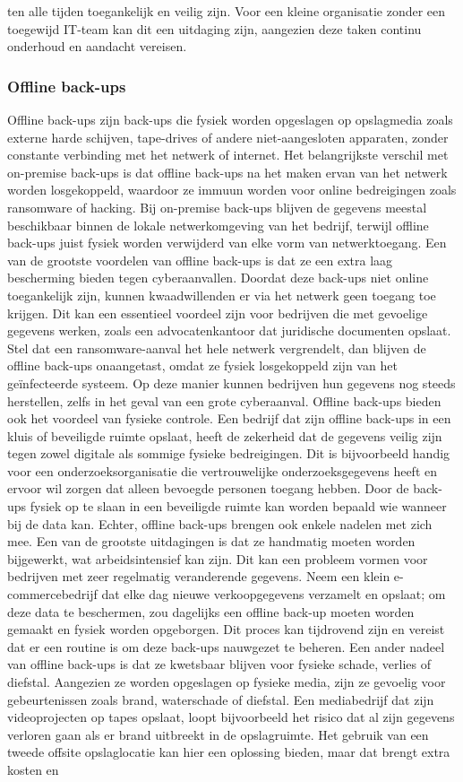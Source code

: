ten alle tijden toegankelijk en veilig zijn. Voor een kleine organisatie zonder een toegewijd IT-team kan dit een uitdaging zijn, aangezien deze taken continu onderhoud en aandacht vereisen.
\subsubsection{Offline back-ups}
Offline back-ups zijn back-ups die fysiek worden opgeslagen op opslagmedia zoals externe harde schijven, tape-drives of andere niet-aangesloten apparaten, zonder constante verbinding met het netwerk of internet. Het belangrijkste verschil met on-premise back-ups is dat offline back-ups na het maken ervan van het netwerk worden losgekoppeld, waardoor ze immuun worden voor online bedreigingen zoals ransomware of hacking. Bij on-premise back-ups blijven de gegevens meestal beschikbaar binnen de lokale netwerkomgeving van het bedrijf, terwijl offline back-ups juist fysiek worden verwijderd van elke vorm van netwerktoegang. Een van de grootste voordelen van offline back-ups is dat ze een extra laag bescherming bieden tegen cyberaanvallen. Doordat deze back-ups niet online toegankelijk zijn, kunnen kwaadwillenden er via het netwerk geen toegang toe krijgen. Dit kan een essentieel voordeel zijn voor bedrijven die met gevoelige gegevens werken, zoals een advocatenkantoor dat juridische documenten opslaat. Stel dat een ransomware-aanval het hele netwerk vergrendelt, dan blijven de offline back-ups onaangetast, omdat ze fysiek losgekoppeld zijn van het geïnfecteerde systeem. Op deze manier kunnen bedrijven hun gegevens nog steeds herstellen, zelfs in het geval van een grote cyberaanval. Offline back-ups bieden ook het voordeel van fysieke controle. Een bedrijf dat zijn offline back-ups in een kluis of beveiligde ruimte opslaat, heeft de zekerheid dat de gegevens veilig zijn tegen zowel digitale als sommige fysieke bedreigingen. Dit is bijvoorbeeld handig voor een onderzoeksorganisatie die vertrouwelijke onderzoeksgegevens heeft en ervoor wil zorgen dat alleen bevoegde personen toegang hebben. Door de back-ups fysiek op te slaan in een beveiligde ruimte kan worden bepaald wie wanneer bij de data kan. Echter, offline back-ups brengen ook enkele nadelen met zich mee. Een van de grootste uitdagingen is dat ze handmatig moeten worden bijgewerkt, wat arbeidsintensief kan zijn. Dit kan een probleem vormen voor bedrijven met zeer regelmatig veranderende gegevens. Neem een klein e-commercebedrijf dat elke dag nieuwe verkoopgegevens verzamelt en opslaat; om deze data te beschermen, zou dagelijks een offline back-up moeten worden gemaakt en fysiek worden opgeborgen. Dit proces kan tijdrovend zijn en vereist dat er een routine is om deze back-ups nauwgezet te beheren. Een ander nadeel van offline back-ups is dat ze kwetsbaar blijven voor fysieke schade, verlies of diefstal. Aangezien ze worden opgeslagen op fysieke media, zijn ze gevoelig voor gebeurtenissen zoals brand, waterschade of diefstal. Een mediabedrijf dat zijn videoprojecten op tapes opslaat, loopt bijvoorbeeld het risico dat al zijn gegevens verloren gaan als er brand uitbreekt in de opslagruimte. Het gebruik van een tweede offsite opslaglocatie kan hier een oplossing bieden, maar dat brengt extra kosten en 